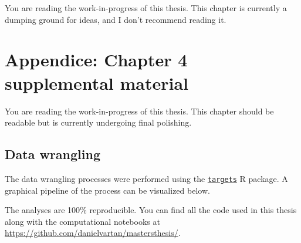 \documentclass[
  12pt,
  a4paper,
  oneside]{tesesusp}
\begin{document}
\begin{tcolorbox}[enhanced jigsaw, breakable, colback=white, colbacktitle=quarto-callout-important-color!10!white, leftrule=.75mm, left=2mm, toprule=.15mm, opacityback=0, rightrule=.15mm, title=\textcolor{quarto-callout-important-color}{\faExclamation}\hspace{0.5em}{Important}, opacitybacktitle=0.6, bottomtitle=1mm, titlerule=0mm, toptitle=1mm, coltitle=black, colframe=quarto-callout-important-color-frame, bottomrule=.15mm, arc=.35mm]

You are reading the work-in-progress of this thesis. This chapter is
currently a dumping ground for ideas, and I don't recommend reading it.

\end{tcolorbox}

\hypertarget{appendice-chapter-4-supplemental-material}{%
\chapter{Appendice: Chapter 4 supplemental
material}\label{appendice-chapter-4-supplemental-material}}

\begin{tcolorbox}[enhanced jigsaw, breakable, colback=white, colbacktitle=quarto-callout-note-color!10!white, leftrule=.75mm, left=2mm, toprule=.15mm, opacityback=0, rightrule=.15mm, title=\textcolor{quarto-callout-note-color}{\faInfo}\hspace{0.5em}{Note}, opacitybacktitle=0.6, bottomtitle=1mm, titlerule=0mm, toptitle=1mm, coltitle=black, colframe=quarto-callout-note-color-frame, bottomrule=.15mm, arc=.35mm]

You are reading the work-in-progress of this thesis. This chapter should
be readable but is currently undergoing final polishing.

\end{tcolorbox}

\hypertarget{data-wrangling}{%
\section{Data wrangling}\label{data-wrangling}}

The data wrangling processes were performed using the
\href{https://github.com/ropensci/targets}{\texttt{targets}} R package.
A graphical pipeline of the process can be visualized below.

The analyses are 100\% reproducible. You can find all the code used in
this thesis along with the computational notebooks at
\url{https://github.com/danielvartan/mastersthesis/}.
\end{document}
